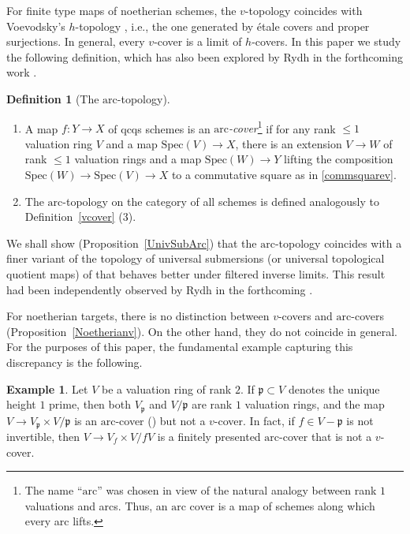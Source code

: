 \documentclass[reqno]{amsart}
\newcommand{\arc}{\mathrm{arc}}
\theoremstyle{definition}
\newtheorem{definition}[theorem]{Definition}
\newtheorem{example}[theorem]{Example}
\begin{document}
For finite type maps of noetherian schemes, the $v$-topology 
coincides with Voevodsky's $h$-topology \cite[Sec. 3]{VHomology},
i.e., the one generated by \'etale covers and proper surjections. 
In general, every $v$-cover is a limit of $h$-covers. 
In this paper we study the following definition, which has also been explored by Rydh in the forthcoming work \cite{RydhII}. 

\begin{definition}[The $\arc$-topology]
\label{DefArcTop}
\begin{enumerate}
\item A map $f\colon Y \to X$ of qcqs schemes is an \emph{$\arc$-cover}\footnote{The name ``$\arc$'' was chosen in view of the natural analogy between rank $1$ valuations and arcs. Thus, an $\arc$ cover is a map of schemes along which every arc lifts.} if for any rank
$\leq 1$ valuation ring $V$ and a map $\mathrm{Spec}(V) \to X$, there is an extension $V \to
W$ of rank $\leq 1$ valuation rings and a map $\mathrm{Spec}(W) \to Y$ lifting the
composition $\mathrm{Spec}(W) \to \mathrm{Spec}(V) \to X$ to a commutative square as in \eqref{commsquarev}. 

\item The $\arc$-topology on the category of all schemes is defined analogously to Definition~\ref{vcover} (3).
\end{enumerate}
\end{definition}

We shall show (Proposition~\ref{UnivSubArc}) that the $\arc$-topology coincides with a finer variant of the topology of universal submersions (or universal topological quotient maps) of \cite{Pic, Rydh} that behaves better under filtered inverse limits.  This result had been independently observed by Rydh in the forthcoming  \cite{RydhII}. 

For noetherian targets, there is no distinction between $v$-covers and $\arc$-covers (Proposition~\ref{Noetherianv}). On the other hand, they do not coincide in general.
For the purposes of this paper,
the fundamental example  capturing this discrepancy is the following. 

\begin{example}
\label{ExValRingArc}
Let $V$ be a valuation ring of rank $2$. If $\mathfrak{p} \subset V$ denotes the
unique height $1$ prime, then both $V_{\mathfrak{p}}$ and $V/\mathfrak{p}$ are
rank $1$ valuation rings, and the map $V \to V_{\mathfrak{p}} \times
V/\mathfrak{p}$ is an $\arc$-cover () but not a $v$-cover. In fact, if $f \in V - \mathfrak{p}$ is not invertible, then $V \to V_f \times V/fV$ is a finitely presented $\arc$-cover that is not a $v$-cover.
\end{example}
\end{document}
